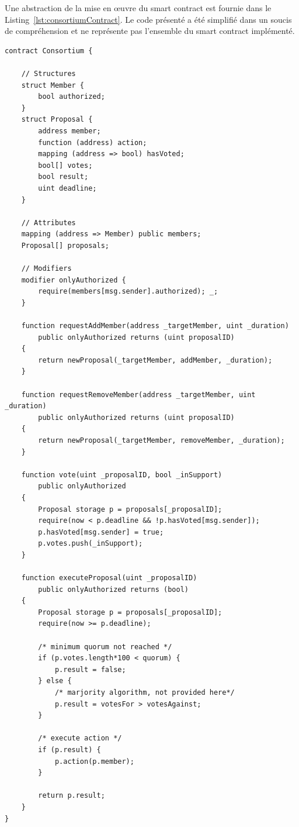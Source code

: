 \documentclass{tnreport}
\begin{document}
Une abstraction de la mise en œuvre du smart contract est fournie dans le Listing~\ref{lst:consortiumContract}. Le code présenté a été simplifié dans un soucis de compréhension et ne représente pas l'ensemble du smart contract implémenté.

\begin{lstlisting}[language=solidity, basicstyle=\small, caption={Consortium Contract}, label={lst:consortiumContract}]
contract Consortium {

	// Structures
	struct Member {
		bool authorized;
	}	
	struct Proposal {
		address member;
		function (address) action;
		mapping (address => bool) hasVoted;
		bool[] votes;
		bool result;
		uint deadline;
	}

	// Attributes
	mapping (address => Member) public members;
	Proposal[] proposals;

	// Modifiers
	modifier onlyAuthorized {
		require(members[msg.sender].authorized); _;
	}

	function requestAddMember(address _targetMember, uint _duration)
		public onlyAuthorized returns (uint proposalID)
	{
		return newProposal(_targetMember, addMember, _duration);
	}

	function requestRemoveMember(address _targetMember, uint _duration)
		public onlyAuthorized returns (uint proposalID)
	{
		return newProposal(_targetMember, removeMember, _duration);
	}

	function vote(uint _proposalID, bool _inSupport)
		public onlyAuthorized
	{
		Proposal storage p = proposals[_proposalID];
		require(now < p.deadline && !p.hasVoted[msg.sender]);
		p.hasVoted[msg.sender] = true;
		p.votes.push(_inSupport);
	}

	function executeProposal(uint _proposalID)
		public onlyAuthorized returns (bool)
	{
		Proposal storage p = proposals[_proposalID];
		require(now >= p.deadline);
		
		/* minimum quorum not reached */
		if (p.votes.length*100 < quorum) { 
			p.result = false;
		} else {		
			/* marjority algorithm, not provided here*/
			p.result = votesFor > votesAgainst;
		}

		/* execute action */
		if (p.result) {
			p.action(p.member);
		}
		
		return p.result;
	}
}
\end{lstlisting}
\end{document}
